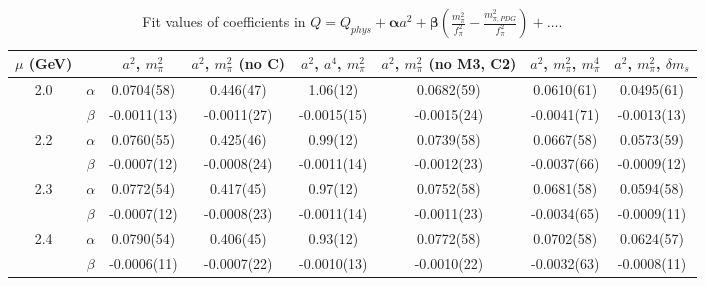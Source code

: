 \documentclass[12pt]{extarticle}
\begin{document}
\begin{table}[h!]
\begin{center}
\begin{tabular}{|c c|c|c|c|c|c|c|}
\hline
$\mu$ (GeV) &  & $a^2$, $m_\pi^2$& $a^2$, $m_\pi^2$ (no C)& $a^2$, $a^4$, $m_\pi^2$& $a^2$, $m_\pi^2$ (no M3, C2)& $a^2$, $m_\pi^2$, $m_\pi^4$& $a^2$, $m_\pi^2$, $\delta m_s$\\
\hline
\multirow{2}{0.5in}{2.0} & $\alpha$ & 0.0704(58)& 0.446(47)& 1.06(12)& 0.0682(59)& 0.0610(61)& 0.0495(61)\\
 & $\beta$ & -0.0011(13)& -0.0011(27)& -0.0015(15)& -0.0015(24)& -0.0041(71)& -0.0013(13)\\
\hline
\multirow{2}{0.5in}{2.2} & $\alpha$ & 0.0760(55)& 0.425(46)& 0.99(12)& 0.0739(58)& 0.0667(58)& 0.0573(59)\\
 & $\beta$ & -0.0007(12)& -0.0008(24)& -0.0011(14)& -0.0012(23)& -0.0037(66)& -0.0009(12)\\
\hline
\multirow{2}{0.5in}{2.3} & $\alpha$ & 0.0772(54)& 0.417(45)& 0.97(12)& 0.0752(58)& 0.0681(58)& 0.0594(58)\\
 & $\beta$ & -0.0007(12)& -0.0008(23)& -0.0011(14)& -0.0011(23)& -0.0034(65)& -0.0009(11)\\
\hline
\multirow{2}{0.5in}{2.4} & $\alpha$ & 0.0790(54)& 0.406(45)& 0.93(12)& 0.0772(58)& 0.0702(58)& 0.0624(57)\\
 & $\beta$ & -0.0006(11)& -0.0007(22)& -0.0010(13)& -0.0010(22)& -0.0032(63)& -0.0008(11)\\
\hline
\end{tabular}
\caption{Fit values of coefficients in $Q = Q_{phys} + \mathbf{\alpha} a^2 + \mathbf{\beta}\left(\frac{m_\pi^2}{f_\pi^2}-\frac{m_{\pi,PDG}^2}{f_\pi^2}\right) + \ldots$.}
\end{center}
\end{table}
























\clearpage
\end{document}
